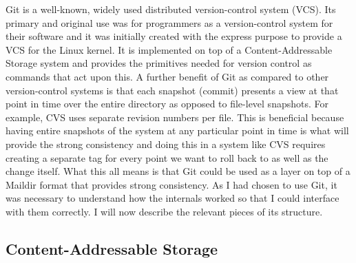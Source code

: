 Git\cite{code_git} is a well-known, widely used distributed version-control system (VCS). Its primary and original use was for programmers as a version-control system for their software and it was initially created with the express purpose to provide a VCS for the Linux kernel\cite{chacon2014git}. It is implemented on top of a Content-Addressable Storage system and provides the primitives needed for version control as commands that act upon this. A further benefit of Git as compared to other version-control systems is that each snapshot (commit) presents a view at that point in time over the entire directory as opposed to file-level snapshots. For example, CVS\cite{code_cvs} uses separate revision numbers per file. This is beneficial because having entire snapshots of the system at any particular point in time is what will provide the strong consistency and doing this in a system like CVS requires creating a separate tag for every point we want to roll back to as well as the change itself. What this all means is that Git could be used as a layer on top of a Maildir format that provides strong consistency. As I had chosen to use Git, it was necessary to understand how the internals worked so that I could interface with them correctly. I will now describe the relevant pieces of its structure.

\subsection{Content-Addressable Storage}

